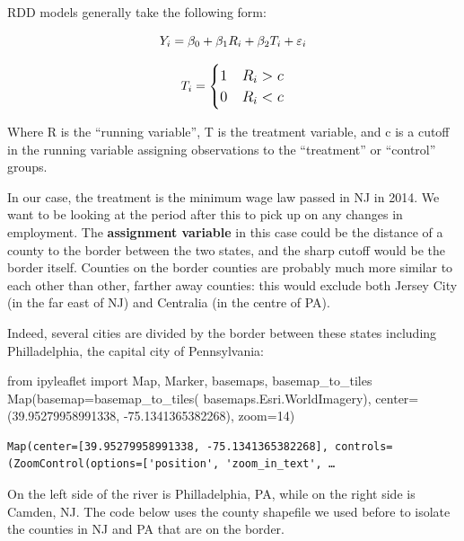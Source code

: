 \documentclass[
  letterpaper,
  DIV=11,
  numbers=noendperiod]{scrreprt}
\newenvironment{Shaded}{\begin{snugshade}}{\end{snugshade}}
\newcommand{\DecValTok}[1]{\textcolor[rgb]{0.68,0.00,0.00}{#1}}
\newcommand{\FloatTok}[1]{\textcolor[rgb]{0.68,0.00,0.00}{#1}}
\newcommand{\ImportTok}[1]{\textcolor[rgb]{0.00,0.46,0.62}{#1}}
\newcommand{\NormalTok}[1]{\textcolor[rgb]{0.00,0.23,0.31}{#1}}
\newcommand{\OperatorTok}[1]{\textcolor[rgb]{0.37,0.37,0.37}{#1}}
\begin{document}
RDD models generally take the following form:

\[\huge Y_{i} = \beta_0 + \beta_1 R_i + \beta_2 T_i + \varepsilon_{i}\]

\[\large T_i=    \begin{cases}
      1 & R_i>c\\
      0 & R_i<c\\
    \end{cases} \]

Where R is the ``running variable'', T is the treatment variable, and c
is a cutoff in the running variable assigning observations to the
``treatment'' or ``control'' groups.

In our case, the treatment is the minimum wage law passed in NJ in 2014.
We want to be looking at the period after this to pick up on any changes
in employment. The \textbf{assignment variable} in this case could be
the distance of a county to the border between the two states, and the
sharp cutoff would be the border itself. Counties on the border counties
are probably much more similar to each other than other, farther away
counties: this would exclude both Jersey City (in the far east of NJ)
and Centralia (in the centre of PA).

Indeed, several cities are divided by the border between these states
including Philladelphia, the capital city of Pennsylvania:

\begin{Shaded}
\begin{Highlighting}[]
\ImportTok{from}\NormalTok{ ipyleaflet }\ImportTok{import}\NormalTok{ Map, Marker, basemaps, basemap\_to\_tiles}
\NormalTok{Map(basemap}\OperatorTok{=}\NormalTok{basemap\_to\_tiles(}
\NormalTok{    basemaps.Esri.WorldImagery),}
\NormalTok{  center}\OperatorTok{=}\NormalTok{(}\FloatTok{39.95279958991338}\NormalTok{, }\OperatorTok{{-}}\FloatTok{75.1341365382268}\NormalTok{),}
\NormalTok{  zoom}\OperatorTok{=}\DecValTok{14}\NormalTok{)}
\end{Highlighting}
\end{Shaded}

\begin{verbatim}
Map(center=[39.95279958991338, -75.1341365382268], controls=(ZoomControl(options=['position', 'zoom_in_text', …
\end{verbatim}

On the left side of the river is Philladelphia, PA, while on the right
side is Camden, NJ. The code below uses the county shapefile we used
before to isolate the counties in NJ and PA that are on the border.
\end{document}
